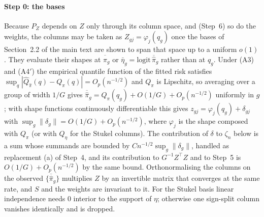 \documentclass[11pt]{article}
\newcommand{\pibar}{\overline{\hat{\pi}}}
\begin{document}
\paragraph{Step 0: the bases} Because $P_Z$ depends on $Z$ only through its column space, and
(Step~6) so do the weights, the columns may be taken as $Z_{gj}=\varphi_j(q_g)$ once the bases of
Section~2.2 of the main text are shown to span that space up to a uniform $o(1)$. They evaluate their
shapes at $\pibar_g$ or $\bar\eta_g=\mathrm{logit}\,\pibar_g$ rather than at $q_g$. Under (A3) and
(A4$'$) the empirical quantile function of the fitted risk satisfies
$\sup_q|\hat Q_{\hat\pi}(q)-Q_\pi(q)|=O_p(n^{-1/2})$ and $Q_\pi$ is Lipschitz, so averaging over a
group of width $1/G$ gives $\pibar_g=Q_\pi(q_g)+O(1/G)+O_p(n^{-1/2})$ uniformly in $g$; with shape
functions continuously differentiable this gives $z_{gj}=\varphi_j(q_g)+\delta_{gj}$ with
$\sup_g\|\delta_g\|=O(1/G)+O_p(n^{-1/2})$, where $\varphi_j$ is the shape composed with $Q_\pi$ (or
with $Q_\eta$ for the Stukel columns). The contribution of $\delta$ to $\zeta_n$ below is a sum whose
summands are bounded by $Cn^{-1/2}\sup_g\|\delta_g\|$, handled as replacement (a) of Step~4, and its
contribution to $G^{-1}Z^\top Z$ and to Step~5 is $O(1/G)+O_p(n^{-1/2})$ by the same bound.
Orthonormalising the columns on the observed $\{\pibar_g\}$ multiplies $Z$ by an invertible matrix
that converges at the same rate, and $S$ and the weights are invariant to it. For the Stukel basis
linear independence needs $0$ interior to the support of $\eta$; otherwise one sign-split column
vanishes identically and is dropped.
\end{document}
